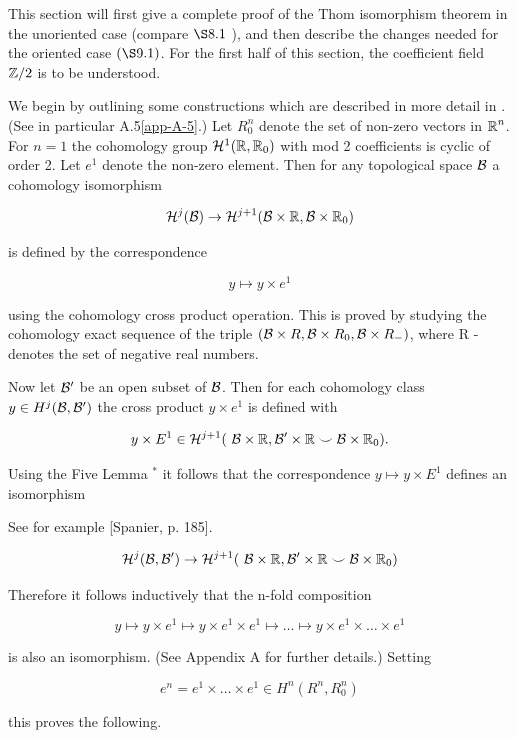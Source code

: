 This section will first give a complete proof of the Thom isomorphism theorem in the unoriented case (compare $\S 8.1$ ), and then describe the changes needed for the oriented case $(\S 9.1)$. For the first half of this section, the coefficient field $\mathbb{Z} / 2$ is to be understood.

We begin by outlining some constructions which are described in more detail in . (See in particular A.5\cref{app-A-5}.) Let $R_{0}^{ n }$ denote the set of non-zero vectors in $\boldsymbol{\mathbb{R}}^{ n }$. For $ n =1$ the cohomology group $\mathcal{H}^{1}(\boldsymbol{\mathbb{R}}, \boldsymbol{\mathbb{R}}_{0})$ with mod 2 coefficients is cyclic of order 2. Let $e^{1}$ denote the non-zero element. Then for any topological space $\mathcal{B}$ a cohomology isomorphism

\[
\mathcal{H}^{j}(\mathcal{B}) \rightarrow \mathcal{H}^{j+1}(\mathcal{B} \times \boldsymbol{\mathbb{R}}, \mathcal{B} \times \boldsymbol{\mathbb{R}}_{0})
\]

is defined by the correspondence

\[
y \mapsto y \times e^{1}
\]

using the cohomology cross product operation. This is proved by studying the cohomology exact sequence of the triple $(\mathcal{B} \times R, \mathcal{B} \times R_{0}, \mathcal{B} \times R_{-})$, where R - denotes the set of negative real numbers.

Now let $\mathcal{B}^{\prime}$ be an open subset of $\mathcal{B}$. Then for each cohomology class $y \in H^{j}(\mathcal{B}, \mathcal{B}^{\prime})$ the cross product $y \times e^{1}$ is defined with

\[
 y  \times E^{1} \in  \mathcal{H}^{j+1}(\mathrm{~\mathcal{B}} \times \boldsymbol{\mathbb{R}}, \mathcal{B}^{\prime} \times \boldsymbol{\mathbb{R}} \smile \mathcal{B} \times \boldsymbol{\mathbb{R}}_{0}) .
\]

Using the Five Lemma ${ }^{*}$ it follows that the correspondence $ y  \mapsto  y  \times E^{1}$ defines an isomorphism

See for example [Spanier, p. 185]. 

\[
\mathcal{H}^{j}(\mathcal{B}, \mathcal{B}^{\prime}) \rightarrow \mathcal{H}^{j+1}(\mathrm{~\mathcal{B}} \times \boldsymbol{\mathbb{R}}, \mathcal{B}^{\prime} \times \boldsymbol{\mathbb{R}} \smile \mathcal{B} \times \boldsymbol{\mathbb{R}}_{0})
\]

Therefore it follows inductively that the n-fold composition

\[
y \mapsto y \times e^{1} \mapsto y \times e^{1} \times e^{1} \mapsto \dots \mapsto y \times e^{1} \times \dots \times e^{1}
\]

is also an isomorphism. (See Appendix A for further details.) Setting

\[
e^{n}=e^{1} \times \dots \times e^{1} \in H^{n}(R^{n}, R_{0}^{n})
\]

this proves the following.

